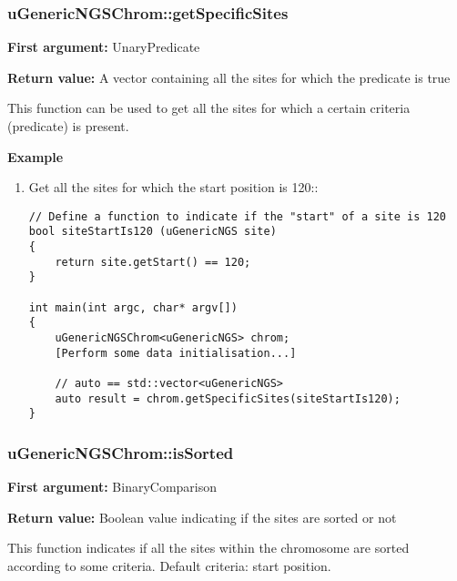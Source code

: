 \documentclass[letterpaper,10pt]{article}
\begin{document}
\subsubsection{uGenericNGSChrom::getSpecificSites}
\textbf{First argument:} UnaryPredicate

\noindent{}\textbf{Return value:} A vector containing all the sites for which the predicate is true

\bigskip
\noindent{}This function can be used to get all the sites for which a certain criteria (predicate) is present.

\bigskip
\noindent{}\textbf{Example}
\begin{enumerate}
 \item Get all the sites for which the start position is 120::
\begin{verbatim}
// Define a function to indicate if the "start" of a site is 120
bool siteStartIs120 (uGenericNGS site)
{
    return site.getStart() == 120;
}

int main(int argc, char* argv[])
{
    uGenericNGSChrom<uGenericNGS> chrom;
    [Perform some data initialisation...]

    // auto == std::vector<uGenericNGS>
    auto result = chrom.getSpecificSites(siteStartIs120);
}
\end{verbatim}
\end{enumerate}

\subsubsection{uGenericNGSChrom::isSorted}
\textbf{First argument:} BinaryComparison

\noindent{}\textbf{Return value:} Boolean value indicating if the sites are sorted or not

\bigskip
\noindent{}This function indicates if all the sites within the chromosome are sorted according to some criteria. Default criteria: start position.
\end{document}
